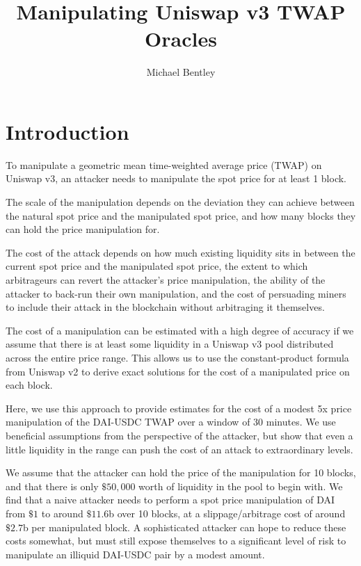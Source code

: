 \documentclass[a4paper, 11pt]{article}
\begin{document}
\title{Manipulating Uniswap v3 TWAP Oracles}
\author{Michael Bentley}

\maketitle

\section{Introduction}

To manipulate a geometric mean time-weighted average price (TWAP) on Uniswap v3, an attacker needs to manipulate the spot price for at least 1 block. 

The scale of the manipulation depends on the deviation they can achieve between the natural spot price and the manipulated spot price, and how many blocks they can hold the price manipulation for. 

The cost of the attack depends on how much existing liquidity sits in between the current spot price and the manipulated spot price, the extent to which arbitrageurs can revert the attacker's price manipulation, the ability of the attacker to back-run their own manipulation, and the cost of persuading miners to include their attack in the blockchain without arbitraging it themselves.

The cost of a manipulation can be estimated with a high degree of accuracy if we assume that there is at least some liquidity in a Uniswap v3 pool distributed across the entire price range. This allows us to use the constant-product formula from Uniswap v2 to derive exact solutions for the cost of a manipulated price on each block. 

Here, we use this approach to provide estimates for the cost of a modest 5x price manipulation of the DAI-USDC TWAP over a window of 30 minutes. We use beneficial assumptions from the perspective of the attacker, but show that even a little liquidity in the range can push the cost of an attack to extraordinary levels. 

We assume that the attacker can hold the price of the manipulation for 10 blocks, and that there is only $\$50,000$ worth of liquidity in the pool to begin with. We find that a naive attacker needs to perform a spot price manipulation of DAI from $\$1$ to around $\$11.6$b over 10 blocks, at a slippage/arbitrage cost of around $\$2.7$b per manipulated block. A sophisticated attacker can hope to reduce these costs somewhat, but must still expose themselves to a significant level of risk to manipulate an illiquid DAI-USDC pair by a modest amount. 
\end{document}
